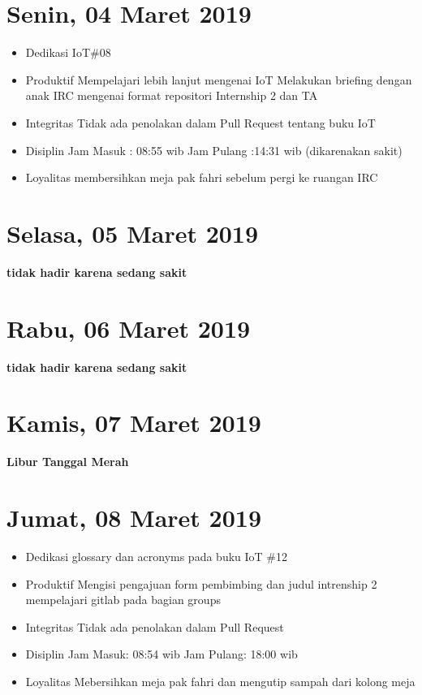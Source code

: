 \section{Senin, 04 Maret 2019}
\begin{itemize}
\item Dedikasi
\subitem IoT\#08
\item Produktif
  \subitem Mempelajari lebih lanjut mengenai IoT
  \subitem Melakukan briefing dengan anak IRC mengenai format repositori Internship 2 dan TA
\item Integritas
  \subitem Tidak ada penolakan dalam Pull Request tentang buku IoT
\item Disiplin
  \subitem Jam Masuk : 08:55 wib
  \subitem Jam Pulang :14:31 wib (dikarenakan sakit)
\item Loyalitas
  \subitem membersihkan meja pak fahri sebelum pergi ke ruangan IRC
\end{itemize} 

\section{Selasa, 05 Maret 2019}
\textbf{tidak hadir karena sedang sakit}

\section{Rabu, 06 Maret 2019}
\textbf{tidak hadir karena sedang sakit}

\section{Kamis, 07 Maret 2019}
\textbf{Libur Tanggal Merah}

\section{Jumat, 08 Maret 2019}
\begin{itemize}
\item Dedikasi
  \subitem glossary dan acronyms pada buku IoT \#12
\item Produktif
  \subitem Mengisi pengajuan form pembimbing dan judul intrenship 2
  \subitem mempelajari gitlab pada bagian groups 
\item Integritas
  \subitem Tidak ada penolakan dalam Pull Request
\item Disiplin
  \subitem Jam Masuk:  08:54 wib
  \subitem Jam Pulang: 18:00 wib
\item Loyalitas
  \subitem Mebersihkan meja pak fahri dan mengutip sampah dari kolong meja 
\end{itemize}


